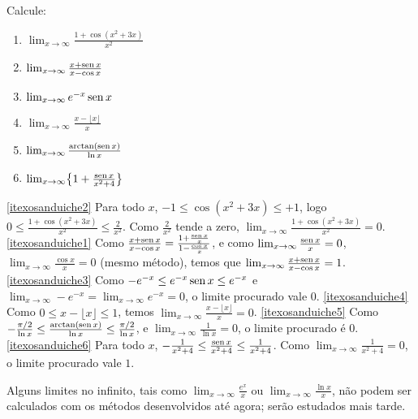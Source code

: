 \begin{exo} Calcule:
\begin{multicols}{3}
\begin{enumerate}
\item\label{itexosanduiche2}
$\lim_{x\to\infty}\frac{1+\cos(x^2+3x)}{x^2}$
\item\label{itexosanduiche1} $\lim_{x\to\infty}\frac{x+\operatorname{sen} x}{x-\cos
x}$
\item\label{itexosanduiche3} $\lim_{x\to\infty}e^{-x}\operatorname{sen} x$
\item\label{itexosanduiche4}
$\lim_{x\to\infty}\frac{x-\lfloor x\rfloor}{x}$
\item\label{itexosanduiche5}
$\lim_{x\to \infty}\frac{\arctan(\operatorname{sen} x)}{\ln x}$
\item\label{itexosanduiche6}
$\lim_{x\to\infty}\bigl\{1+\frac{\operatorname{sen} x}{x^2+4}\bigr\}$
\end{enumerate}
\end{multicols}
\vspace{0.01cm}
\begin{sol}
\eqref{itexosanduiche2} Para todo $x$, $-1\leq
\cos(x^2+3x)\leq +1$, logo
$0\leq \frac{1+\cos(x^2+3x)}{x^2}\leq \frac{2}{x^2}$.
Como $\frac{2}{x^2}$ tende a zero,
$\lim_{x\to\infty}\frac{1+\cos(x^2+3x)}{x^2}=0$.
\eqref{itexosanduiche1} Como $\frac{x+\operatorname{sen} x}{x-\cos
x}=\frac{1+\frac{\operatorname{sen} x}{x}}{1-\frac{\cos x}{x}}$, e como
$\lim_{x\to\infty}\frac{\operatorname{sen} x}{x}=0$, $\lim_{x\to\infty}\frac{\cos
x}{x}=0$ (mesmo método), temos que $\lim_{x\to\infty}\frac{x+\operatorname{sen}
x}{x-\cos x}=1$.
\eqref{itexosanduiche3} 
Como $-e^{-x}\leq e^{-x}\operatorname{sen} x\leq e^{-x}$ e 
$\lim_{x\to\infty}-e^{-x}=\lim_{x\to\infty}e^{-x}=0$, o limite
procurado vale $0$.
\eqref{itexosanduiche4} Como $0\leq x-\lfloor x\rfloor\leq 1$, temos
$\lim_{x\to\infty}\frac{x-\lfloor x\rfloor}{x}=0$.
\eqref{itexosanduiche5} Como
$-\frac{\pi/2}{\ln x}\leq \frac{\arctan(\operatorname{sen} x)}{\ln x}\leq
\frac{\pi/2}{\ln x}$, e $\lim_{x\to\infty}\frac{1}{\ln x}=0$, o
limite procurado é $0$.
\eqref{itexosanduiche6} Para todo $x$,
$-\frac{1}{x^2+4}\leq \frac{\operatorname{sen} x}{x^2+4}\leq
\frac{1}{x^2+4}$. Como 
$\lim_{x\to \infty}\frac{1}{x^2+4}=0$, o limite procurado vale
$1$.
\end{sol}
\end{exo}


\begin{obs}
Alguns limites no infinito, tais como
$\lim_{x\to \infty}\frac{e^x}{x}$  ou  $\lim_{x\to \infty} \frac{\ln x}{x}$,
não podem ser calculados com os métodos desenvolvidos até agora; serão estudados mais tarde.
\end{obs}

